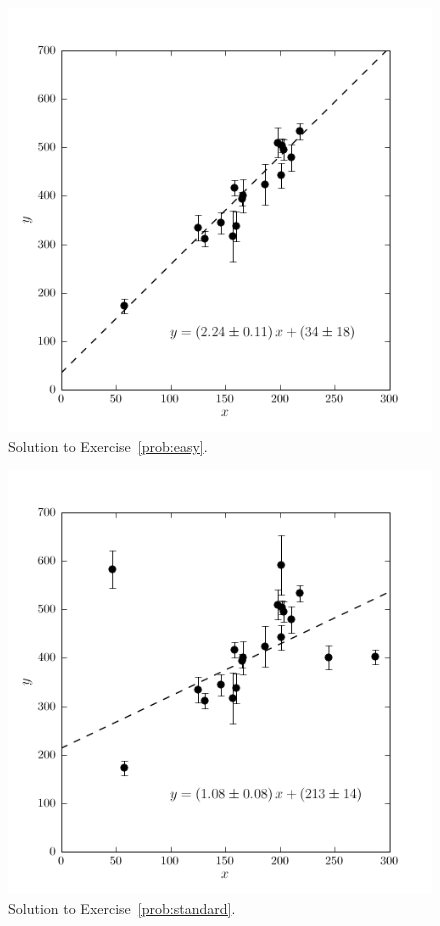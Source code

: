 \documentclass[12pt,twoside]{article}
\newcommand{\problemname}{Exercise}
\newcounter{problem}
\begin{document}
\clearpage
{}
\begin{figure}[H]
\includegraphics[]{ex1.png}
\caption{Solution to \problemname~\ref{prob:easy}.}\label{fig:easy}
\end{figure}

\clearpage
\begin{figure}[H]
\includegraphics[]{ex2.png}
\caption{Solution to \problemname~\ref{prob:standard}.}\label{fig:standard}
\end{figure}
\end{document}
